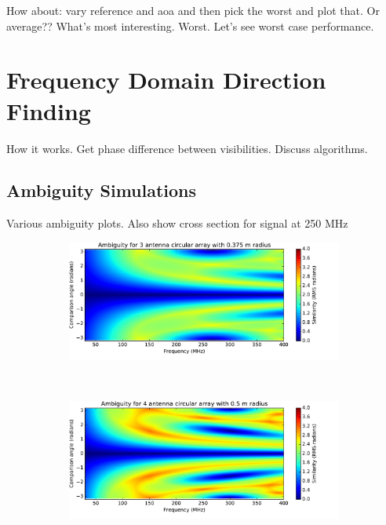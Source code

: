 How about: vary reference and aoa and then pick the worst and plot that. Or average?? What's most interesting. Worst. Let's see worst case performance. 

\section{Frequency Domain Direction Finding}
How it works. Get phase difference between visibilities. 
Discuss algorithms. 

\subsection{Ambiguity Simulations}
Various ambiguity plots. 
Also show cross section for signal at 250 MHz
\begin{figure}
  \centering
  \begin{subfigure}{\textwidth}
    \centering
    \includegraphics[width=\textwidth, clip=true, trim = 0 15 53 0]{ambiguity03}
  \end{subfigure}\\[1em]
  \begin{subfigure}{\textwidth}
    \centering
    \includegraphics[width=\textwidth, clip=true, trim = 0 15 53 0]{ambiguity04}
  \end{subfigure}\\[1em]
  \begin{subfigure}{\textwidth}

\end{subfigure}
\end{figure}
